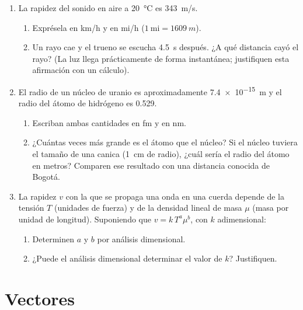 \documentclass[11pt,letterpaper]{article}
\newcommand{\rulesec}{\vspace{-0.7\baselineskip}{\color{UnalGreen}\rule{\textwidth}{0.8pt}}\vspace{0.2\baselineskip}}
\begin{document}
	\begin{enumerate}
		\item La rapidez del sonido en aire a \SI{20}{\celsius} es \SI{343}{m/s}.
		\begin{enumerate}
			\item Exprésela en km/h y en mi/h ($1\ \text{mi}=\SI{1609}{m}$).
			\item Un rayo cae y el trueno se escucha \SI{4,5}{s} después. ¿A qué distancia cayó el rayo? (La luz llega prácticamente de forma instantánea; justifiquen esta afirmación con un cálculo).
		\end{enumerate}
		
		\item El radio de un núcleo de uranio es aproximadamente \SI{7,4e-15}{m} y el radio del átomo de hidrógeno es \SI{0,529}{\text{\AA}}.
		\begin{enumerate}
			\item Escriban ambas cantidades en fm y en nm.
			\item ¿Cuántas veces más grande es el átomo que el núcleo? Si el núcleo tuviera el tamaño de una canica (\SI{1}{cm} de radio), ¿cuál sería el radio del átomo en metros? Comparen ese resultado con una distancia conocida de Bogotá.
		\end{enumerate}
		
		\item La rapidez $v$ con la que se propaga una onda en una cuerda depende de la tensión $T$ (unidades de fuerza) y de la densidad lineal de masa $\mu$ (masa por unidad de longitud). Suponiendo que $v = k\,T^{a}\mu^{b}$, con $k$ adimensional:
		\begin{enumerate}
			\item Determinen $a$ y $b$ por análisis dimensional.
			\item ¿Puede el análisis dimensional determinar el valor de $k$? Justifiquen.
		\end{enumerate}
		
	\end{enumerate}
	
	\section{Vectores \normalfont\small\textit{}}
	\rulesec
	
\end{document}
